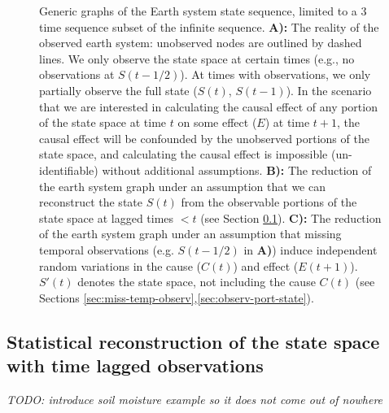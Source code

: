 \documentclass[12pt]{article}
\begin{document}
\begin{figure}
  
  \caption{Generic graphs of the Earth system state sequence, limited
    to a 3 time sequence subset of the infinite sequence. \textbf{A):}
    The reality of the observed earth system: unobserved nodes are
    outlined by dashed lines. We only observe the state space at
    certain times (e.g., no observations at $S(t-1/2)$). At times with
    observations, we only partially observe the full state ($S(t)$,
    $S(t-1)$). In the scenario that we are interested in calculating
    the causal effect of any portion of the state space at time $t$ on
    some effect ($E$) at time $t+1$, the causal effect will be
    confounded by the unobserved portions of the state space, and
    calculating the causal effect is impossible (un-identifiable)
    without additional assumptions. \textbf{B):} The reduction of the
    earth system graph under an assumption that we can reconstruct the
    state $S(t)$ from the observable portions of the state space at
    lagged times $< t$ (see Section
    \ref{sec:stat-reconstr-state}). \textbf{C):} The reduction of the
    earth system graph under an assumption that missing temporal
    observations (e.g. $S(t-1/2)$ in \textbf{A)}) induce independent
    random variations in the cause ($C(t)$) and effect
    ($E(t+1)$). $S'(t)$ denotes the state space, not including the
    cause $C(t)$ (see Sections
    \ref{sec:miss-temp-observ},\ref{sec:observ-port-state}).}
  \label{fig:generic}
\end{figure}

\subsection{Statistical reconstruction of the state space with time
  lagged observations}
\label{sec:stat-reconstr-state}

\textit{TODO: introduce soil moisture example so it does not come out
  of nowhere}
\end{document}

